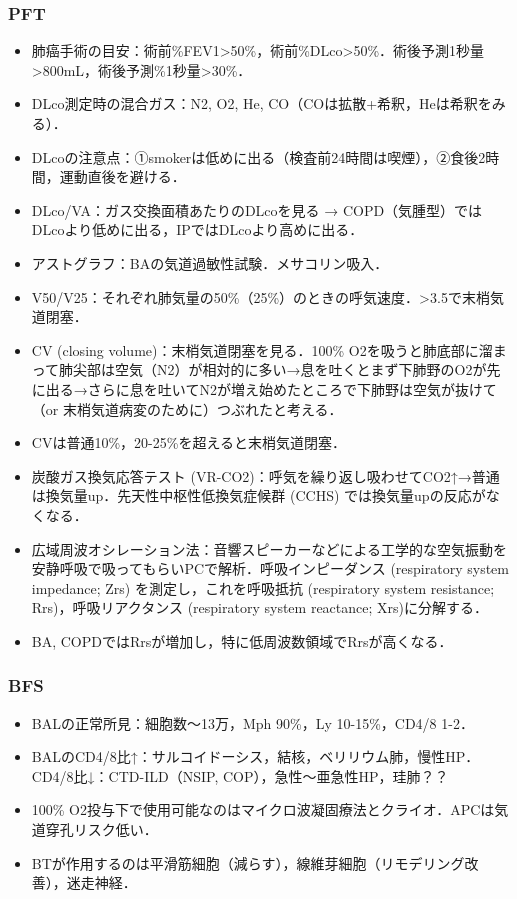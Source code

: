 \subsubsection{PFT}

\begin{itemize}
\item 肺癌手術の目安：術前\%FEV1>50\%，術前\%DLco>50\%．術後予測1秒量>800mL，術後予測\%1秒量>30\%．
\item DLco測定時の混合ガス：N2, O2, He, CO（COは拡散+希釈，Heは希釈をみる）．
\item DLcoの注意点：①smokerは低めに出る（検査前24時間は喫煙），②食後2時間，運動直後を避ける．
\item DLco/VA：ガス交換面積あたりのDLcoを見る → COPD（気腫型）ではDLcoより低めに出る，IPではDLcoより高めに出る．
\item アストグラフ：BAの気道過敏性試験．メサコリン吸入．
\item V50/V25：それぞれ肺気量の50\%（25\%）のときの呼気速度．>3.5で末梢気道閉塞．
\item CV (closing volume)：末梢気道閉塞を見る．100\% O2を吸うと肺底部に溜まって肺尖部は空気（N2）が相対的に多い→息を吐くとまず下肺野のO2が先に出る→さらに息を吐いてN2が増え始めたところで下肺野は空気が抜けて（or 末梢気道病変のために）つぶれたと考える．\item CVは普通10\%，20-25\%を超えると末梢気道閉塞．
\item 炭酸ガス換気応答テスト (VR-CO2)：呼気を繰り返し吸わせてCO2↑→普通は換気量up．先天性中枢性低換気症候群 (CCHS) では換気量upの反応がなくなる．
\item 広域周波オシレーション法：音響スピーカーなどによる工学的な空気振動を安静呼吸で吸ってもらいPCで解析．呼吸インピーダンス (respiratory system impedance; Zrs) を測定し，これを呼吸抵抗 (respiratory system resistance; Rrs)，呼吸リアクタンス (respiratory system reactance; Xrs)に分解する．
\item BA, COPDではRrsが増加し，特に低周波数領域でRrsが高くなる．
\end{itemize}


\subsubsection{BFS}

\begin{itemize}
\item BALの正常所見：細胞数〜13万，Mph 90\%，Ly 10-15\%，CD4/8 1-2．
\item BALのCD4/8比↑：サルコイドーシス，結核，ベリリウム肺，慢性HP．CD4/8比↓：CTD-ILD（NSIP, COP），急性〜亜急性HP，珪肺？？
\item 100\% O2投与下で使用可能なのはマイクロ波凝固療法とクライオ．APCは気道穿孔リスク低い．
\item BTが作用するのは平滑筋細胞（減らす），線維芽細胞（リモデリング改善），迷走神経．
\end{itemize}


